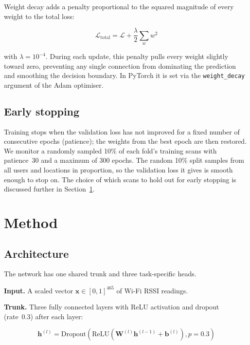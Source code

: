 \documentclass[conference]{IEEEtran}
\begin{document}
Weight decay adds a penalty proportional to the squared magnitude of every weight to the total
loss:

\begin{equation}
  \mathcal{L}_{\text{total}} = \mathcal{L} + \frac{\lambda}{2} \sum_w w^2
\end{equation}

with $\lambda = 10^{-4}$. During each update, this penalty pulls every weight slightly toward
zero, preventing any single connection from dominating the prediction and smoothing the decision
boundary. In PyTorch it is set via the \texttt{weight\_decay} argument of the Adam optimiser.

\subsection{Early stopping}

Training stops when the validation loss has not improved for a fixed number of consecutive epochs
(patience); the weights from the best epoch are then restored. We monitor a randomly sampled 10\%
of each fold's training scans with patience~30 and a maximum of 300 epochs. The random 10\% split
samples from all users and locations in proportion, so the validation loss it gives is smooth
enough to stop on. The choice of which scans to hold out for
early stopping is discussed further in Section~\ref{sec:method}.

\section{Method}
\label{sec:method}

\subsection{Architecture}

The network has one shared trunk and three task-specific heads.

\textbf{Input.} A scaled vector $\mathbf{x} \in [0,1]^{465}$ of Wi-Fi RSSI readings.

\textbf{Trunk.} Three fully connected layers with ReLU activation and dropout (rate~0.3) after
each layer:

\begin{equation}
  \mathbf{h}^{(l)} = \text{Dropout}\!\left(\text{ReLU}\!\left(\mathbf{W}^{(l)}\mathbf{h}^{(l-1)}
  + \mathbf{b}^{(l)}\right), p=0.3\right)
\end{equation}
\end{document}
